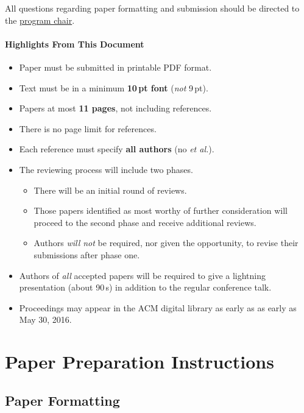 \documentclass[pldi]{sigplanconf-pldi16}
\begin{document}
All questions regarding paper formatting and submission should be
directed to the
\href{mailto:emery@cs.umass.edu?subject=[PLDI'16]}{program
  chair}.

\paragraph{Highlights From This Document}
\begin{itemize}[noitemsep]
\item Paper must be submitted in printable PDF format.
\item Text must be in a minimum \textbf{10\,pt font} (\emph{not} 9\,pt).
\item Papers at most \textbf{11 pages}, not including references. 
\item There is no page limit for references. 
\item Each reference must specify \textbf{all authors} (no \emph{et al.}). 
\item The reviewing process will include two phases.
  \begin{itemize}
  \item There will be an initial round of reviews.
  \item Those papers identified as most worthy of further consideration will proceed to the second phase and receive additional reviews.
  \item Authors \emph{will not} be required, nor given the opportunity, to revise their submissions after phase one.
  \end{itemize}
\item Authors of \emph{all} accepted papers will be required to give a
  lightning presentation (about 90\,s) in addition to
  the regular conference talk.
\item Proceedings may appear in the ACM digital library as early as as early as May 30, 2016.
\end{itemize} 



\section{Paper Preparation Instructions}

\subsection{Paper Formatting}
\end{document}
